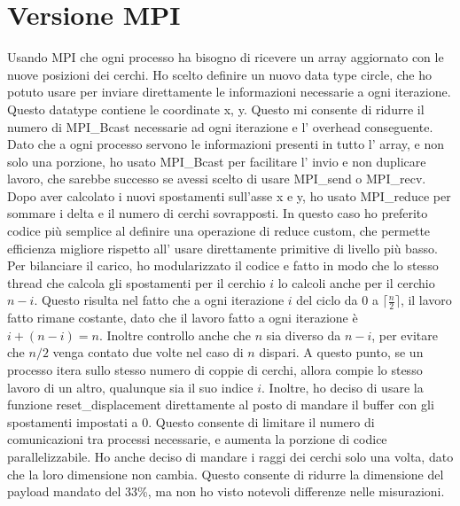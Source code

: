 \documentclass[a4paper,11pt, twoside]{report}
\begin{document}
\section*{Versione MPI}
Usando MPI che ogni processo ha bisogno di ricevere un array aggiornato con le nuove posizioni dei cerchi.
Ho scelto definire un nuovo data type circle, che ho potuto usare per inviare direttamente le informazioni necessarie a ogni iterazione.
Questo datatype contiene le coordinate x, y.
Questo mi consente di ridurre il numero di MPI\_Bcast necessarie ad ogni iterazione e l' overhead conseguente.
Dato che a ogni processo servono le informazioni presenti in tutto l' array, e non solo una porzione, ho usato MPI\_Bcast per facilitare l' invio e non duplicare lavoro,
che sarebbe successo se avessi scelto di usare MPI\_send o  MPI\_recv.
Dopo aver calcolato i nuovi spostamenti sull'asse x e y, ho usato MPI\_reduce per sommare i delta e il numero di cerchi sovrapposti.
In questo caso ho preferito codice più semplice al definire una operazione di reduce custom,
che permette efficienza migliore rispetto all' usare direttamente primitive di livello più basso.
Per bilanciare il carico, ho modularizzato il codice e fatto in modo che lo stesso thread che calcola gli spostamenti per il cerchio $i$ lo calcoli anche per il cerchio $n-i$.
Questo risulta nel fatto che a ogni iterazione $i$ del ciclo da $0$ a $\lceil \frac{n}{2} \rceil$, il lavoro fatto rimane costante, dato che il lavoro fatto a ogni iterazione è $i + (n-i) = n$.
Inoltre controllo anche che $n$ sia diverso da $n-i$, per evitare che $n/2$ venga contato due volte nel caso di $n$ dispari.
A questo punto, se un processo itera sullo stesso numero di coppie di cerchi, allora compie lo stesso lavoro di un altro, qualunque sia il suo indice $i$.
Inoltre, ho deciso di usare la funzione reset\_displacement direttamente al posto di mandare il buffer con gli spostamenti impostati a 0.
Questo consente di limitare il numero di comunicazioni tra processi necessarie, e aumenta la porzione di codice parallelizzabile.
Ho anche deciso di mandare i raggi dei cerchi solo una volta, dato che la loro dimensione non cambia.
Questo consente di ridurre la dimensione del payload mandato del 33\%, ma non ho visto notevoli differenze nelle misurazioni.
\end{document}

